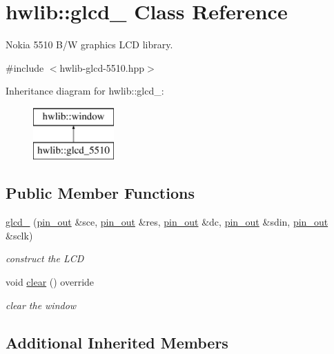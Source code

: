 \hypertarget{classhwlib_1_1glcd__5510}{}\section{hwlib\+:\+:glcd\+\_ Class Reference}
\label{classhwlib_1_1glcd__5510}


Nokia 5510 B/W graphics L\+CD library.  




{\ttfamily \#include $<$hwlib-\/glcd-\/5510.\+hpp$>$}

Inheritance diagram for hwlib\+:\+:glcd\+\_\+:\begin{figure}[H]
\begin{center}
\leavevmode
\includegraphics[height=2.000000cm]{classhwlib_1_1glcd__5510}
\end{center}
\end{figure}
\subsection*{Public Member Functions}
\begin{DoxyCompactItemize}
\item 
\hyperlink{classhwlib_1_1glcd__5510_a689cb8a2f60f76f087b83626b2ca931a}{glcd\+\_} (\hyperlink{classhwlib_1_1pin__out}{pin\+\_\+out} \&sce, \hyperlink{classhwlib_1_1pin__out}{pin\+\_\+out} \&res, \hyperlink{classhwlib_1_1pin__out}{pin\+\_\+out} \&dc, \hyperlink{classhwlib_1_1pin__out}{pin\+\_\+out} \&sdin, \hyperlink{classhwlib_1_1pin__out}{pin\+\_\+out} \&sclk)
\begin{DoxyCompactList}\small\item\em construct the L\+CD \end{DoxyCompactList}\item 
void \hyperlink{classhwlib_1_1glcd__5510_a533b2663e151bee909543d0038b2cb4d}{clear} () override
\begin{DoxyCompactList}\small\item\em clear the window \end{DoxyCompactList}\end{DoxyCompactItemize}
\subsection*{Additional Inherited Members}


